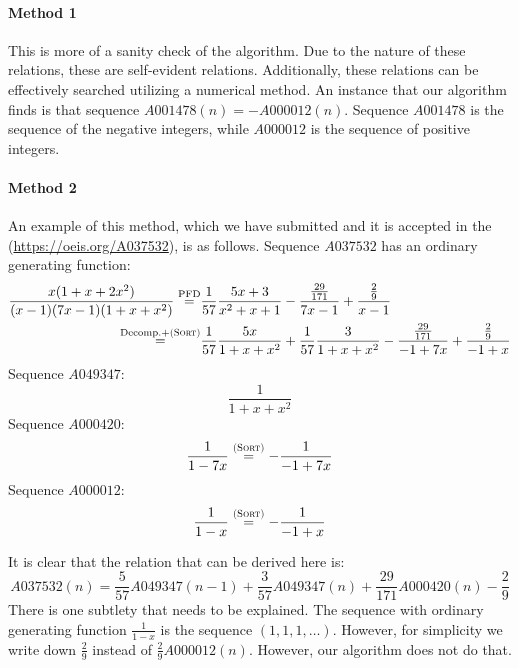 \paragraph{Method 1}
This is more of a sanity check of the algorithm. Due to the nature of these relations, these are self-evident
relations. Additionally, these relations can be effectively searched utilizing a numerical method. An instance that
our algorithm finds is that sequence $A001478(n) = -A000012(n)$. Sequence $A001478$ is the sequence of the negative
integers, while $A000012$ is the sequence of positive integers.

\paragraph{Method 2}
An example of this method, which we have submitted and it is accepted in the \oeis (\url{https://oeis.org/A037532}),
is as follows.
Sequence $A037532$ has an ordinary generating function:
\begin{align}
\frac{x(1+x+2x^2)}{(x-1)(7x-1)(1+x+x^2)} \stackrel{\text{PFD}}{=} &\frac{1}{57}\frac{5x + 3}{x^2 + x + 1} -
\frac{\frac{29}{171}}{7x- 1} + \frac{\frac{2}{9}}{x - 1} \\
\stackrel{\text{Decomp.} + \rulename{Sort}}{=} &\frac{1}{57}\frac{5x}{1+x+x^2} + \frac{1}{57}\frac{3}{1+x+x^2} -
\frac{\frac{29}{171}}{-1 + 7x} + \frac{\frac{2}{9}}{-1 + x}
\end{align}
Sequence $A049347$:
\begin{equation}
\frac{1}{1+x+x^2}
\end{equation}
Sequence $A000420$:
\begin{equation}
\frac{1}{1-7x} \stackrel{\rulename{Sort}}{=} -\frac{1}{-1+7x}
\end{equation}
Sequence $A000012$:
\begin{equation}
\frac{1}{1-x} \stackrel{\rulename{Sort}}{=} -\frac{1}{-1+x}
\end{equation}

It is clear that the relation that can be derived here is:
\begin{equation} \label{eq:accepted}
A037532(n) = \frac{5}{57}A049347(n-1) + \frac{3}{57}A049347(n) + \frac{29}{171}A000420(n) - \frac{2}{9}
\end{equation}
There is one subtlety that needs to be explained. The sequence with ordinary generating function $\frac{1}{1-x}$ is
the sequence $(1,1,1, \ldots)$. However, for simplicity we write down $\frac{2}{9}$ instead of $\frac{2}{9}A000012(n)
$. However, our algorithm does not do that.

